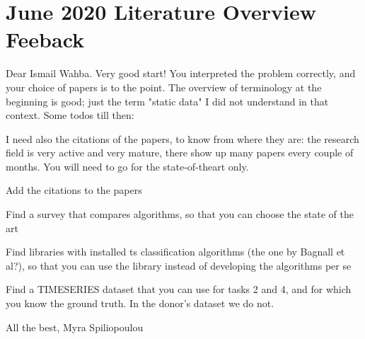 \documentclass{article}
\newcommand{\cmark}{\ding{51}}%
\newcommand{\done}{\rlap{$\square$}{\raisebox{2pt}{\large\hspace{1pt}\cmark}}%
\hspace{-2.5pt}}
\begin{document}
\section*{\texorpdfstring{}. June 2020 Literature Overview Feeback}
Dear Ismail Wahba.
Very good start! You interpreted the problem correctly, and your choice of papers is to the point. The overview of terminology at the beginning is good; just the term "static data" I did not understand in that context.\newline
Some todos till then:
\begin{todolist}
	\item [\done] I need also the citations of the papers, to know from where they are: the research field is very active and very mature, there show up many papers every couple of months. You will need to go for the state-of-theart only.
	\item [\done] Add the citations to the papers
	\item [\done] Find a survey that compares algorithms, so that you can choose the state of the art
	\item [\done] Find libraries with installed ts classification algorithms (the one by Bagnall et al?), so that you can use the library instead of developing the algorithms per se
	\item [\done] Find a TIMESERIES dataset that you can use for tasks 2 and 4, and for which you know the ground truth. In the donor's dataset we do not.
\end{todolist}
All the best,
Myra Spiliopoulou
\end{document}
